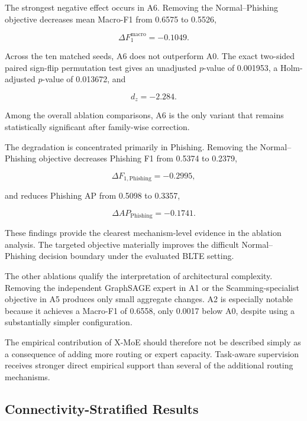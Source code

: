 \documentclass{ieeeaccess}
\begin{document}
The strongest negative effect occurs in A6. Removing the Normal--Phishing objective decreases mean Macro-F1 from 0.6575 to 0.5526,

\begin{equation}
\Delta F_{1}^{\mathrm{macro}}=-0.1049.
\end{equation}

Across the ten matched seeds, A6 does not outperform A0. The exact two-sided paired sign-flip permutation test gives an unadjusted \(p\)-value of 0.001953, a Holm-adjusted \(p\)-value of 0.013672, and

\begin{equation}
d_z=-2.284.
\end{equation}

Among the overall ablation comparisons, A6 is the only variant that remains statistically significant after family-wise correction.

The degradation is concentrated primarily in Phishing. Removing the Normal--Phishing objective decreases Phishing F1 from 0.5374 to 0.2379,

\begin{equation}
\Delta F_{1,\mathrm{Phishing}}
=
-0.2995,
\end{equation}

and reduces Phishing AP from 0.5098 to 0.3357,

\begin{equation}
\Delta AP_{\mathrm{Phishing}}
=
-0.1741.
\end{equation}

These findings provide the clearest mechanism-level evidence in the ablation analysis. The targeted objective materially improves the difficult Normal--Phishing decision boundary under the evaluated BLTE setting.

The other ablations qualify the interpretation of architectural complexity. Removing the independent GraphSAGE expert in A1 or the Scamming-specialist objective in A5 produces only small aggregate changes. A2 is especially notable because it achieves a Macro-F1 of 0.6558, only 0.0017 below A0, despite using a substantially simpler configuration.

The empirical contribution of X-MoE should therefore not be described simply as a consequence of adding more routing or expert capacity. Task-aware supervision receives stronger direct empirical support than several of the additional routing mechanisms.


\subsection{Connectivity-Stratified Results}
\end{document}
